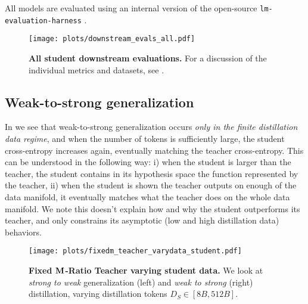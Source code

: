 All models are evaluated using an internal version of the open-source \texttt{lm-evaluation-harness} \citep{eval-harness}.

\begin{figure}[h]
	\centering
	\texttt{[image: plots/downstream\_evals\_all.pdf]}
	\caption{\textbf{All student downstream evaluations.} For a discussion of the individual metrics and datasets, see .
	}
	\label{fig:downstream-evals-all}
\end{figure}

\FloatBarrier


\FloatBarrier
\subsection{Weak-to-strong generalization}
\label{ssec:weak-to-strong-generalization}

In 
we see that weak-to-strong generalization \citep{DBLP:conf/icml/BurnsIKBGACEJLS24,DBLP:journals/corr/abs-2410-18837} occurs \emph{only in the finite distillation data regime},
and when the number of tokens is sufficiently large, the student cross-entropy increases again, eventually matching the teacher cross-entropy.
This can be understood in the following way: i) when the student is larger than the teacher, the student contains in its hypothesis space the function represented by the teacher, ii)
when the student is shown the teacher outputs on enough of the data manifold, it
eventually matches what the teacher does on the whole data manifold.
We note this doesn't explain how and why the student outperforms its teacher, and only constrains its asymptotic (low and high distillation data) behaviors.
\begin{figure}[h]
	\centering
    \texttt{[image: plots/fixedm\_teacher\_varydata\_student.pdf]}
	\caption{\textbf{Fixed $\bf M$-Ratio Teacher varying student data.} We look at \emph{strong to weak} generalization (left) and \emph{weak to strong} (right) distillation, varying distillation tokens $D_S\in[8B,512B]$.
	}
	\label{fig:distillation-fixedm-teacher-varydata-student}
\end{figure}

\FloatBarrier

